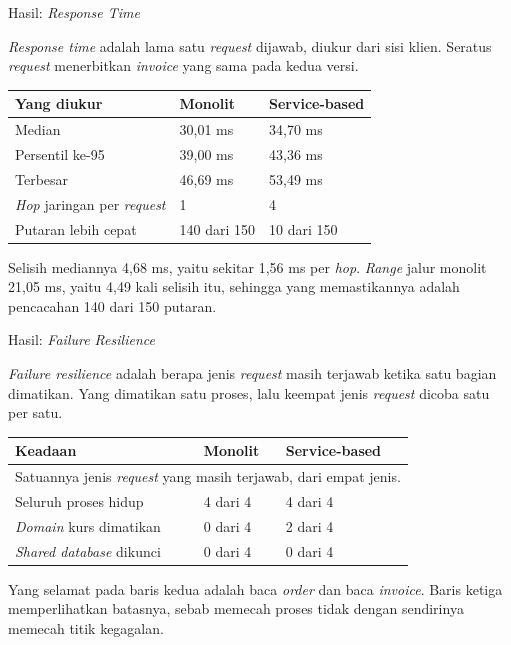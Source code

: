 \documentclass[aspectratio=169, table, 12pt]{beamer}
\begin{document}
\begin{frame}{{\Large Hasil: \textit{Response Time}}}
  \vspace{4pt}
  \raggedright
  {\small \textit{Response time} adalah lama satu \textit{request} dijawab,
  diukur dari sisi klien. Seratus \textit{request} menerbitkan \textit{invoice} yang
  sama pada kedua versi.}

  \vspace{4pt}
  \centering
  \small
  \begin{tabularx}{0.9\textwidth}{|X|l|l|}
    \hline
    \textbf{Yang diukur} & \textbf{Monolit} & \textbf{Service-based} \\
    \hline
    Median & 30,01 ms & 34,70 ms \\
    \hline
    Persentil ke-95 & 39,00 ms & 43,36 ms \\
    \hline
    Terbesar & 46,69 ms & 53,49 ms \\
    \hline
    \textit{Hop} jaringan per \textit{request} & 1 & 4 \\
    \hline
    Putaran lebih cepat & 140 dari 150 & 10 dari 150 \\
    \hline
  \end{tabularx}

  \vspace{8pt}
  {\small Selisih mediannya 4,68 ms, yaitu sekitar 1,56 ms per \textit{hop}.
  \textit{Range} jalur monolit 21,05 ms, yaitu 4,49 kali selisih itu, sehingga
  yang memastikannya adalah pencacahan 140 dari 150 putaran.}
\end{frame}

\begin{frame}{{\Large Hasil: \textit{Failure Resilience}}}
  \vspace{4pt}
  \raggedright
  {\small \textit{Failure resilience} adalah berapa jenis \textit{request}
  masih terjawab ketika satu bagian dimatikan. Yang dimatikan satu proses,
  lalu keempat jenis \textit{request} dicoba satu per satu.}

  \vspace{4pt}
  \centering
  \small
  \begin{tabularx}{0.9\textwidth}{|X|l|l|}
    \hline
    \textbf{Keadaan} & \textbf{Monolit} & \textbf{Service-based} \\
    \hline
    \multicolumn{3}{|l|}{\footnotesize Satuannya jenis \textit{request} yang
      masih terjawab, dari empat jenis.} \\
    \hline
    Seluruh proses hidup & 4 dari 4 & 4 dari 4 \\
    \hline
    \textit{Domain} kurs dimatikan & 0 dari 4 & 2 dari 4 \\
    \hline
    \textit{Shared database} dikunci & 0 dari 4 & 0 dari 4 \\
    \hline
  \end{tabularx}

  \vspace{8pt}
  \raggedright
  {\small Yang selamat pada baris kedua adalah baca \textit{order} dan baca \textit{invoice}.
  Baris ketiga memperlihatkan batasnya, sebab memecah proses tidak dengan
  sendirinya memecah titik kegagalan.}
\end{frame}
\end{document}

